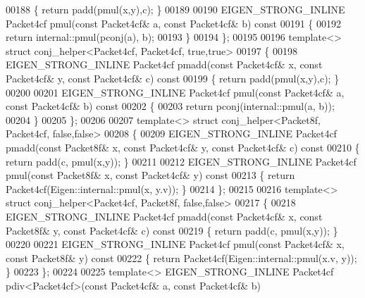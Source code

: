 \begin{DoxyCode}
00188 \textcolor{keyword}{  }\{ \textcolor{keywordflow}{return} padd(pmul(x,y),c); \}
00189 
00190   EIGEN\_STRONG\_INLINE Packet4cf pmul(\textcolor{keyword}{const} Packet4cf& a, \textcolor{keyword}{const} Packet4cf& b)\textcolor{keyword}{ const}
00191 \textcolor{keyword}{  }\{
00192     \textcolor{keywordflow}{return} internal::pmul(pconj(a), b);
00193   \}
00194 \};
00195 
00196 \textcolor{keyword}{template}<> \textcolor{keyword}{struct }conj\_helper<Packet4cf, Packet4cf, true,true>
00197 \{
00198   EIGEN\_STRONG\_INLINE Packet4cf pmadd(\textcolor{keyword}{const} Packet4cf& x, \textcolor{keyword}{const} Packet4cf& y, \textcolor{keyword}{const} Packet4cf& c)\textcolor{keyword}{ const}
00199 \textcolor{keyword}{  }\{ \textcolor{keywordflow}{return} padd(pmul(x,y),c); \}
00200 
00201   EIGEN\_STRONG\_INLINE Packet4cf pmul(\textcolor{keyword}{const} Packet4cf& a, \textcolor{keyword}{const} Packet4cf& b)\textcolor{keyword}{ const}
00202 \textcolor{keyword}{  }\{
00203     \textcolor{keywordflow}{return} pconj(internal::pmul(a, b));
00204   \}
00205 \};
00206 
00207 \textcolor{keyword}{template}<> \textcolor{keyword}{struct }conj\_helper<Packet8f, Packet4cf, false,false>
00208 \{
00209   EIGEN\_STRONG\_INLINE Packet4cf pmadd(\textcolor{keyword}{const} Packet8f& x, \textcolor{keyword}{const} Packet4cf& y, \textcolor{keyword}{const} Packet4cf& c)\textcolor{keyword}{ const}
00210 \textcolor{keyword}{  }\{ \textcolor{keywordflow}{return} padd(c, pmul(x,y)); \}
00211 
00212   EIGEN\_STRONG\_INLINE Packet4cf pmul(\textcolor{keyword}{const} Packet8f& x, \textcolor{keyword}{const} Packet4cf& y)\textcolor{keyword}{ const}
00213 \textcolor{keyword}{  }\{ \textcolor{keywordflow}{return} Packet4cf(Eigen::internal::pmul(x, y.v)); \}
00214 \};
00215 
00216 \textcolor{keyword}{template}<> \textcolor{keyword}{struct }conj\_helper<Packet4cf, Packet8f, false,false>
00217 \{
00218   EIGEN\_STRONG\_INLINE Packet4cf pmadd(\textcolor{keyword}{const} Packet4cf& x, \textcolor{keyword}{const} Packet8f& y, \textcolor{keyword}{const} Packet4cf& c)\textcolor{keyword}{ const}
00219 \textcolor{keyword}{  }\{ \textcolor{keywordflow}{return} padd(c, pmul(x,y)); \}
00220 
00221   EIGEN\_STRONG\_INLINE Packet4cf pmul(\textcolor{keyword}{const} Packet4cf& x, \textcolor{keyword}{const} Packet8f& y)\textcolor{keyword}{ const}
00222 \textcolor{keyword}{  }\{ \textcolor{keywordflow}{return} Packet4cf(Eigen::internal::pmul(x.v, y)); \}
00223 \};
00224 
00225 \textcolor{keyword}{template}<> EIGEN\_STRONG\_INLINE Packet4cf pdiv<Packet4cf>(\textcolor{keyword}{const} Packet4cf& a, \textcolor{keyword}{const} Packet4cf& b)

\end{DoxyCode}
